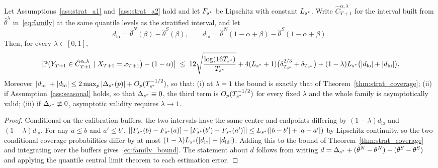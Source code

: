 \begin{proposition}
\label{prop:family_coverage}
Let Assumptions~\ref{ass:strat_a1} and~\ref{ass:strat_a2} hold and let
$F_{s^*}$ be Lipschitz with constant $L_{s^*}$.  Write
$\hat{C}_{T+1}^{\alpha,\lambda}$ for the interval built from
$\hat{\theta}^{\lambda}$ in~\eqref{eq:family} at the same quantile levels
as the stratified interval, and let
\[
  d_{\text{lo}}
  = \hat{\theta}^{N}(\beta) - \hat{\theta}^{S}(\beta),
  \qquad
  d_{\text{hi}}
  = \hat{\theta}^{N}(1-\alpha+\beta) - \hat{\theta}^{S}(1-\alpha+\beta).
\]
Then, for every $\lambda \in [0,1]$,
\begin{equation}
  \label{eq:family_bound}
  \bigl|
    \mathbb{P}\bigl(Y_{T+1} \in \hat{C}_{T+1}^{\alpha,\lambda}
               \mid X_{T+1} = x_{T+1}\bigr) - (1-\alpha)
  \bigr|
  \;\leq\;
  12\sqrt{\frac{\log(16T_{s^*})}{T_{s^*}}}
  + 4(L_{s^*}+1)\bigl(\delta_{T_{s^*}}^{2/3} + \delta_{T_{s^*}}\bigr)
  + (1-\lambda) L_{s^*}\bigl(|d_{\text{lo}}| + |d_{\text{hi}}|\bigr).
\end{equation}
Moreover $|d_{\text{lo}}| + |d_{\text{hi}}| \leq
2\max_p|\Delta_{s^*}(p)| + O_p(T_{s^*}^{-1/2})$, so that:
\textup{(i)} at $\lambda = 1$ the bound is exactly that of
Theorem~\ref{thm:strat_coverage}; \textup{(ii)} if
Assumption~\ref{ass:seasonal} holds, so that
$\Delta_{s^*} \equiv 0$, the third term is $O_p(T_{s^*}^{-1/2})$ for every
fixed $\lambda$ and the whole family is asymptotically valid;
\textup{(iii)} if $\Delta_{s^*} \not\equiv 0$, asymptotic validity
requires $\lambda \to 1$.
\end{proposition}

\begin{proof}
Conditional on the calibration buffers, the two intervals have the same
centre and endpoints differing by $(1-\lambda)d_{\text{lo}}$ and
$(1-\lambda)d_{\text{hi}}$.  For any $a \leq b$ and $a' \leq b'$,
$|[F_{s^*}(b) - F_{s^*}(a)] - [F_{s^*}(b') - F_{s^*}(a')]|
\leq L_{s^*}(|b-b'| + |a-a'|)$ by Lipschitz continuity, so the two
conditional coverage probabilities differ by at most
$(1-\lambda)L_{s^*}(|d_{\text{lo}}| + |d_{\text{hi}}|)$.  Adding this
to the bound of Theorem~\ref{thm:strat_coverage} and integrating over the
buffers gives~\eqref{eq:family_bound}.  The statement about
$d$ follows from writing $d = \Delta_{s^*} + (\hat{\theta}^{N} -
\theta^{N}) - (\hat{\theta}^{S} - \theta^{S})$ and applying the quantile
central limit theorem to each estimation error.
\end{proof}

